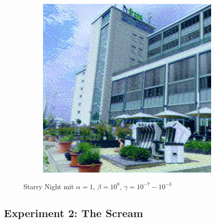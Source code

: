 \begin{figure}[H]
\begin{subfigure}[h]{0.15\textwidth}
    \end{subfigure}
    \begin{subfigure}[h]{0.15\textwidth}
        \centering
        \includegraphics[width=\textwidth]{resources/content/experiments/b__starry_night__768x768__style-weight_1e+08__tv-weight_1e-03.jpg}
    \end{subfigure}
    \caption{Starry Night mit $ \alpha = 1 $, $ \beta = 10^{8} $, $ \gamma = 10^{-7} - 10^{-3} $}
\end{figure}

\pagebreak

\subsection{Experiment 2: The Scream}

